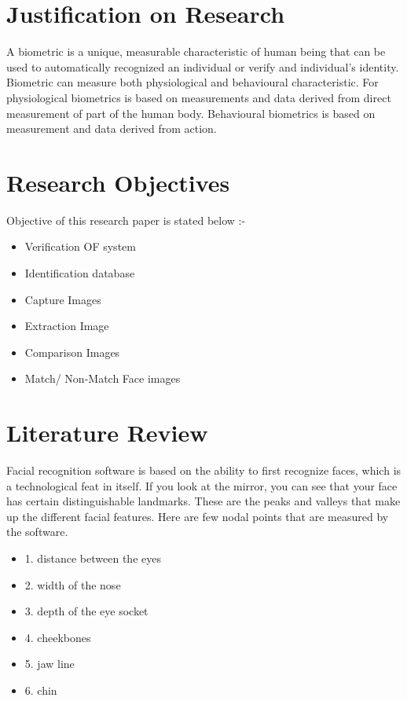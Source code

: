 \documentclass[a4paper,12pt]{article}
\begin{document}
\newpage
\section{Justification on Research}
\hspace{1cm}A biometric is a unique, measurable characteristic of human being that can be used to automatically recognized an individual or verify and individual's identity. Biometric can measure both physiological and behavioural characteristic.
For physiological biometrics is based on measurements and data derived from direct measurement of part of the human body. Behavioural biometrics is based on measurement and data derived from action.


\section{Research Objectives}
\hspace{1cm}Objective of this research paper is stated below :-
\begin{itemize}
\item Verification OF system
\item Identification database
\item Capture Images
\item Extraction Image
\item Comparison Images
\item Match/ Non-Match Face images
\end{itemize}


\section{Literature Review}
\hspace{1cm}Facial recognition software is based on the ability to first recognize faces, which is a technological feat in itself. If you look at the mirror, you can see that your face has certain distinguishable landmarks. These are the peaks and valleys that make up the different facial features. Here are few nodal points that are measured by the software.
\begin{itemize}
\item 1. distance between the eyes
\item 2. width of the nose
\item 3. depth of the eye socket
\item 4. cheekbones
\item 5. jaw line
\item 6. chin
\end{itemize}
\end{document}
